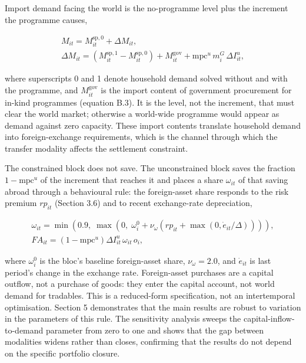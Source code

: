 \documentclass[preprint,review,12pt]{elsarticle}
\begin{document}
Import demand facing the world is the no-programme level plus the
increment the programme causes,

\[\begin{gathered} M_{it} = M^{\mathrm{sp},0}_{it} + \Delta M_{it}, \\ \Delta M_{it} = \left( M^{\mathrm{sp},1}_{it} - M^{\mathrm{sp},0}_{it} \right) + M^{\mathrm{gov}}_{it} + \mathrm{mpc}^u \, m^G_i \, \Delta I^u_{it}, \end{gathered} \tag{13}\]

where superscripts 0 and 1 denote household demand solved without and
with the programme, and \(M^{\mathrm{gov}}_{it}\) is the import content
of government procurement for in-kind programmes (equation B.3). It is
the level, not the increment, that must clear the world market;
otherwise a world-wide programme would appear as demand against zero
capacity. These import contents translate household demand into
foreign-exchange requirements, which is the channel through which the
transfer modality affects the settlement constraint.

The constrained block does not save. The unconstrained block saves the
fraction \(1 - \mathrm{mpc}^u\) of the increment that reaches it and
places a share \(\omega_{it}\) of that saving abroad through a
behavioural rule: the foreign-asset share responds to the risk premium
\(rp_{it}\) (Section 3.6) and to recent exchange-rate depreciation,

\[\begin{gathered} \omega_{it} = \min\left( 0.9,\; \max\left( 0,\; \omega^0_i + \nu_\omega \left( rp_{it} + \max\left(0, \dot{e}_{it}/\Delta\right) \right) \right) \right), \\ FA_{it} = \left( 1 - \mathrm{mpc}^u \right) \Delta I^u_{it} \, \omega_{it} \, o_i, \end{gathered} \tag{14}\]

where \(\omega^0_i\) is the bloc's baseline foreign-asset share,
\(\nu_\omega = 2.0\), and \(\dot{e}_{it}\) is last period's change in
the exchange rate. Foreign-asset purchases are a capital outflow, not a
purchase of goods: they enter the capital account, not world demand for
tradables. This is a reduced-form specification, not an intertemporal
optimisation. Section 5 demonstrates that the main results are robust to
variation in the parameters of this rule. The sensitivity analysis
sweeps the capital-inflow-to-demand parameter from zero to one and shows
that the gap between modalities widens rather than closes, confirming
that the results do not depend on the specific portfolio closure.
\end{document}
